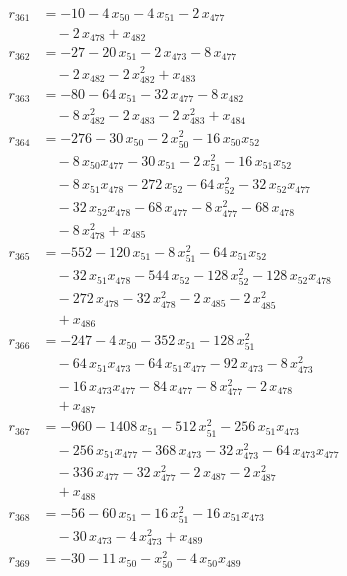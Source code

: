 \begin{align*}
r_{361} &= -10 - 4\,x_{50} - 4\,x_{51} - 2\,x_{477} \\
&\quad{}- 2\,x_{478} + x_{482} \\
r_{362} &= -27 - 20\,x_{51} - 2\,x_{473} - 8\,x_{477} \\
&\quad{}- 2\,x_{482} - 2\,x_{482}^{2} + x_{483} \\
r_{363} &= -80 - 64\,x_{51} - 32\,x_{477} - 8\,x_{482} \\
&\quad{}- 8\,x_{482}^{2} - 2\,x_{483} - 2\,x_{483}^{2} + x_{484} \\
r_{364} &= -276 - 30\,x_{50} - 2\,x_{50}^{2} - 16\,x_{50} x_{52} \\
&\quad{}- 8\,x_{50} x_{477} - 30\,x_{51} - 2\,x_{51}^{2} - 16\,x_{51} x_{52} \\
&\quad{}- 8\,x_{51} x_{478} - 272\,x_{52} - 64\,x_{52}^{2} - 32\,x_{52} x_{477} \\
&\quad{}- 32\,x_{52} x_{478} - 68\,x_{477} - 8\,x_{477}^{2} - 68\,x_{478} \\
&\quad{}- 8\,x_{478}^{2} + x_{485} \\
r_{365} &= -552 - 120\,x_{51} - 8\,x_{51}^{2} - 64\,x_{51} x_{52} \\
&\quad{}- 32\,x_{51} x_{478} - 544\,x_{52} - 128\,x_{52}^{2} - 128\,x_{52} x_{478} \\
&\quad{}- 272\,x_{478} - 32\,x_{478}^{2} - 2\,x_{485} - 2\,x_{485}^{2} \\
&\quad{}+ x_{486} \\
r_{366} &= -247 - 4\,x_{50} - 352\,x_{51} - 128\,x_{51}^{2} \\
&\quad{}- 64\,x_{51} x_{473} - 64\,x_{51} x_{477} - 92\,x_{473} - 8\,x_{473}^{2} \\
&\quad{}- 16\,x_{473} x_{477} - 84\,x_{477} - 8\,x_{477}^{2} - 2\,x_{478} \\
&\quad{}+ x_{487} \\
r_{367} &= -960 - 1408\,x_{51} - 512\,x_{51}^{2} - 256\,x_{51} x_{473} \\
&\quad{}- 256\,x_{51} x_{477} - 368\,x_{473} - 32\,x_{473}^{2} - 64\,x_{473} x_{477} \\
&\quad{}- 336\,x_{477} - 32\,x_{477}^{2} - 2\,x_{487} - 2\,x_{487}^{2} \\
&\quad{}+ x_{488} \\
r_{368} &= -56 - 60\,x_{51} - 16\,x_{51}^{2} - 16\,x_{51} x_{473} \\
&\quad{}- 30\,x_{473} - 4\,x_{473}^{2} + x_{489} \\
r_{369} &= -30 - 11\,x_{50} - x_{50}^{2} - 4\,x_{50} x_{489} \\

\end{align*}
